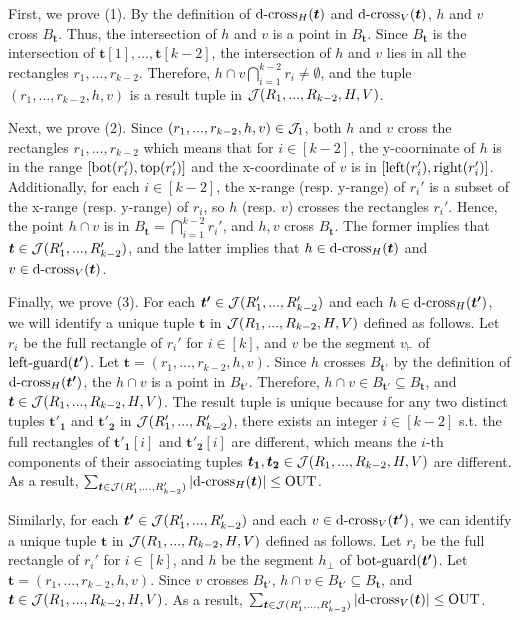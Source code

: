 First, we prove (1). By the definition of $\mathrm{d\text{-}cross}_H(\textrm{\boldmath${t}$})$ and $\mathrm{d\text{-}cross}_V(\textrm{\boldmath${t}$})$, $h$ and $v$ cross $B_\bm{t}$. Thus, the intersection of $h$ and $v$ is a point in $B_\bm{t}$. Since $B_\bm{t}$ is the intersection of $\bm{t}[1],...,\bm{t}[k-2]$, the intersection of $h$ and $v$ lies in all the rectangles $r_1,...,r_{k-2}$. Therefore, $h\cap v\bigcap_{i = 1}^{k-2}r_i \neq \emptyset$, and  the tuple $(r_1,...,r_{k-2},h,v)$ is a result tuple in $\mathcal{J}(R_1,...,R_{k-2},H,V)$. 

Next, we prove (2). Since $(r_1,...,r_{k-2},h,v)\in \mathcal{J}_1$, both $h$
 and $v$ cross the rectangles $r_1,...,r_{k-2}$ which means that for $i\in[k-2]$, the y-coorninate of $h$ is in the range $[\mathrm{bot}(r_i'), \mathrm{top}(r_i')]$ and the x-coordinate of $v$ is in $[\mathrm{left}(r_i'), \mathrm{right}(r_i')]$. Additionally, for each $i\in[k-2]$, the x-range (resp. y-range) of $r_i'$ is a subset of the x-range (resp. y-range) of $r_i$, so $h$ (resp. $v$) crosses the rectangles $r_i'$. Hence, the point $h \cap v$ is in $B_\bm{t} = \bigcap_{i = 1}^{k-2}r_i'$, and $h, v$ cross $B_{\bm{t}}$. The former implies that $\textrm{\boldmath${t}$} \in \mathcal{J}(R_1',...,R_{k-2}')$, and the latter implies that $h \in \mathrm{d\text{-}cross}_H(\textrm{\boldmath${t}$})$ and $v \in \mathrm{d\text{-}cross}_V(\textrm{\boldmath${t}$})$.

Finally, we prove (3). 
For each $\textrm{\boldmath${t'}$}\in  \mathcal{J}(R_1',...,R_{k-2}')$ and each $h \in \mathrm{d\text{-}cross}_H(\textrm{\boldmath${t'}$})$, we will identify a unique tuple $\bm{t}$ in $\mathcal{J}(R_1,...,R_{k-2},H,V)$ defined as follows. Let $r_i$ be the full rectangle of $r_i'$ for $i \in [k]$, and $v$ be the segment $v_\vdash$ of $\mathrm{left\text{-}guard}(\textrm{\boldmath${t'}$})$. Let $\bm{t} = (r_1,...,r_{k-2},h,v)$. Since $h$ crosses $B_{\bm{t'}}$ by the definition of $\mathrm{d\text{-}cross}_H(\textrm{\boldmath${t'}$})$, the $h\cap v$ is a point in $B_{\bm{t'}}$. 
Therefore, $h\cap v \in B_{\bm{t'}} \subseteq B_{\bm{t}}$, and $\textrm{\boldmath${t}$}\in \mathcal{J}(R_1,...,R_{k-2},H,V)$. The result tuple is unique because for any two distinct tuples $\bm{t'_1}$ and $\bm{t'_2}$ in $\mathcal{J}(R_1',...,R_{k-2}')$, there exists an integer $i \in [k-2]$ s.t. the full rectangles of $\bm{t'_1}[i]$ and $\bm{t'_2}[i]$ are different, which means the $i$-th components of their associating tuples $\textrm{\boldmath${t_1}$}, \textrm{\boldmath${t_2}$} \in \mathcal{J}(R_1,...,R_{k-2},H,V)$ are different. As a result, $\sum_{\textrm{\boldmath${t}$}\in \mathcal{J}(R_1',...,R_{k-2}')}  |\mathrm{d\text{-}cross}_H(\textrm{\boldmath${t}$})| \leq \mathrm{OUT}$. 

Similarly, for each $\textrm{\boldmath${t'}$}\in  \mathcal{J}(R_1',...,R_{k-2}')$ and each $v \in \mathrm{d\text{-}cross}_V(\textrm{\boldmath${t'}$})$, we can identify a unique tuple $\bm{t}$ in $\mathcal{J}(R_1,...,R_{k-2},H,V)$ defined as follows. Let $r_i$ be the full rectangle of $r_i'$ for $i \in [k]$, and $h$ be the segment $h_\bot$ of $\mathrm{bot\text{-}guard}(\textrm{\boldmath${t'}$})$. Let $\bm{t} = (r_1,...,r_{k-2},h,v)$. Since $v$ crosses $B_{\bm{t'}}$, $h\cap v \in B_{\bm{t'}} \subseteq B_{\bm{t}}$, and $\textrm{\boldmath${t}$}\in \mathcal{J}(R_1,...,R_{k-2},H,V)$. As a result, $\sum_{\textrm{\boldmath${t}$}\in \mathcal{J}(R_1',...,R_{k-2}')}  |\mathrm{d\text{-}cross}_V(\textrm{\boldmath${t}$})| \leq \mathrm{OUT}$. 